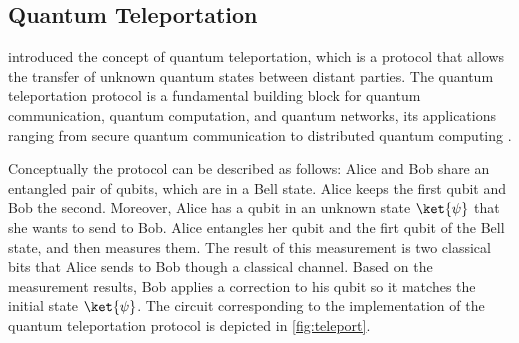 






\subsection{Quantum Teleportation} \label{sec:teleport}

\cite{bennett1993teleporting} introduced the concept of quantum teleportation, which is a protocol that allows the transfer of   unknown quantum states between distant parties.  The quantum teleportation protocol is a fundamental building block for quantum communication, quantum computation, and quantum networks, its applications ranging
from secure quantum communication to distributed quantum computing \cite{briegel1998quantum,gottesman1999demonstrating,kimble2008quantum}. %

Conceptually the protocol can be described as follows: Alice and Bob share an entangled pair of qubits, which are in a Bell state. Alice keeps the first qubit and Bob the second. Moreover, Alice has a qubit in an unknown state $\ket{\psi}$ that she wants to send to Bob.  
 Alice entangles her qubit and the firt qubit of the Bell state, and then measures them. The result of this measurement is two classical bits that Alice sends to Bob though a classical channel. Based on the measurement results, Bob applies a correction to his qubit so it matches the initial state $\ket{\psi}$. 
The circuit corresponding to the implementation of the quantum teleportation protocol is depicted in \autoref{fig:teleport}. 

